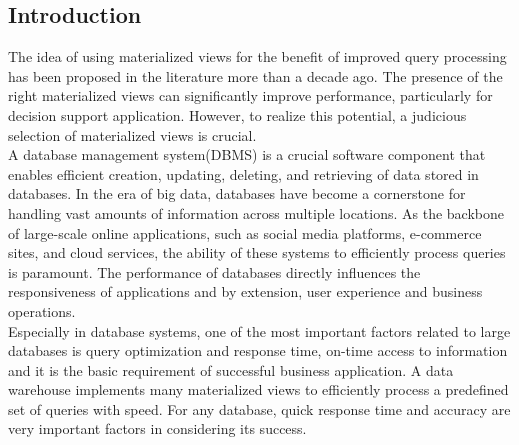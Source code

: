 \subsection{Introduction}
The idea of using materialized views for the benefit of improved query processing has been proposed in the literature more than a decade ago. The presence of the right materialized views can significantly improve performance, particularly for decision support application. However, to realize this potential, a judicious selection of materialized views is crucial.\cite{agrawal2000automated}\\
A database management system(DBMS) is a crucial software component that enables efficient creation, updating, deleting, and retrieving of data stored in databases. In the era of big data, databases have become a cornerstone for handling vast amounts of information across multiple locations. As the backbone of large-scale online applications, such as social media platforms, e-commerce sites, and cloud services, the ability of these systems to efficiently process queries is paramount. The performance of databases directly influences the responsiveness of applications and by extension, user experience and business operations.\cite{4}\\
Especially in database systems, one of the most important factors related to large databases is query  optimization and response time, on-time access to information and it is the basic requirement of successful business application. A data warehouse implements many materialized views to efficiently process a predefined set of queries with speed. For any database, quick response time and accuracy are very important factors in considering its success.\cite{karde2010selection} 

